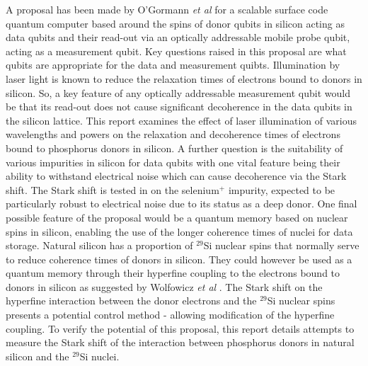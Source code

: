 
A proposal has been made by O'Gormann \emph{et al} for a scalable surface code quantum computer based around the spins of donor qubits in silicon acting as data qubits and their read-out via an optically addressable mobile probe qubit, acting as a measurement qubit. Key questions raised in this proposal are what qubits are appropriate for the data and measurement quibts.
Illumination by laser light is known to reduce the relaxation times of electrons bound to donors in silicon. So, a key feature of any optically addressable measurement qubit would be that its read-out does not cause significant decoherence in the data qubits in the silicon lattice. This report examines the effect of laser illumination of various wavelengths and powers on the relaxation and decoherence times of electrons bound to phosphorus donors in silicon.
A further question is the suitability of various impurities in silicon for data qubits with one vital feature being their ability to withstand electrical noise which can cause decoherence via the Stark shift.
The Stark shift is tested in on the selenium$^{+}$ impurity, expected to be particularly robust to electrical noise due to its status as a deep donor.
One final possible feature of the proposal would be a quantum memory based on nuclear spins in silicon, enabling the use of the longer coherence times of nuclei for data storage.
Natural silicon has a proportion of $^{29}$Si nuclear spins that normally serve to reduce coherence times of donors in silicon. They could however be used as a quantum memory through their hyperfine coupling to the electrons bound to donors in silicon as suggested by Wolfowicz \emph{et al} \cite{Wolfowicz2016a}. The Stark shift on the hyperfine interaction between the donor electrons and the $^{29}$Si nuclear spins presents a potential control method - allowing modification of the hyperfine coupling. To verify the potential of this proposal, this report details attempts to measure the Stark shift of the interaction between phosphorus donors in natural silicon and the $^{29}$Si nuclei.